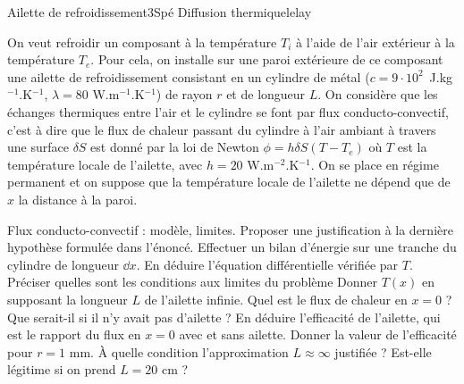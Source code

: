 \begin{exercise}{Ailette de refroidissement}{3}{Spé}
{Diffusion thermique}{lelay}

On veut refroidir un composant à la température $T_i$ à l'aide de l'air extérieur à la température $T_e$. Pour cela, on installe sur une paroi extérieure de ce composant une ailette de refroidissement consistant en un cylindre de métal ($c = 9\cdot10^2$~J.kg$^{-1}$.K$^{-1}$, $\lambda = 80$ W.m$^{-1}$.K$^{-1}$) de rayon $r$ et de longueur $L$. On considère que les échanges thermiques entre l'air et le cylindre se font par flux conducto-convectif, c'est à dire que le flux de chaleur passant du cylindre à l'air ambiant à travers une surface $\delta S$ est donné par la loi de Newton $\phi = h \delta S (T - T_e)$ où $T$ est la température locale de l'ailette, avec $h = 20$ W.m$^{-2}$.K$^{-1}$. On se place en régime permanent et on suppose que la température locale de l'ailette ne dépend que de $x$ la distance à la paroi.

\begin{questions}
    \questioncours Flux conducto-convectif : modèle, limites.
    \question Proposer une justification à la dernière hypothèse formulée dans l'énoncé.
    \question Effectuer un bilan d'énergie sur une tranche du cylindre de longueur $\dd{x}$.
    \question En déduire l'équation différentielle vérifiée par $T$. Préciser quelles sont les conditions aux limites du problème
    \question Donner $T(x)$ en supposant la longueur $L$ de l'ailette infinie.
    \question Quel est le flux de chaleur en $x=0$ ? Que serait-il si il n'y avait pas d'ailette ? En déduire l'efficacité de l'ailette, qui est le rapport du flux en $x = 0$ avec et sans ailette.
    \question Donner la valeur de l'efficacité pour $r = 1$ mm.
    \question À quelle condition l'approximation $L \approx \infty$ justifiée ? Est-elle légitime si on prend $L = 20$ cm ?
\end{questions}


\end{exercise}

